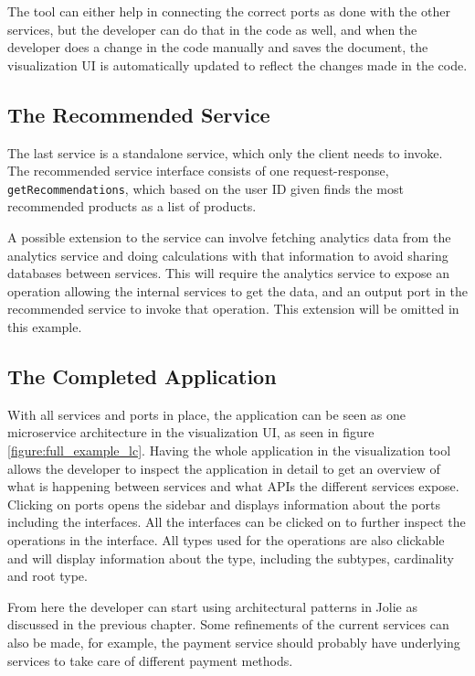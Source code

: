 The tool can either help in connecting the correct ports as done with the other services, but the developer can do that in the code as well, and when the developer does a change in the code manually and saves the document, the visualization UI is automatically updated to reflect the changes made in the code.

\subsection{The Recommended Service}
The last service is a standalone service, which only the client needs to invoke.
The recommended service interface consists of one request-response, \texttt{getRecommendations},
which based on the user ID given finds the most recommended products as a list of products.

A possible extension to the service can involve fetching analytics data from the analytics service and doing calculations with that information to avoid sharing databases between services. This will require the analytics service to expose an operation allowing the internal services to get the data, and an output port in the recommended service to invoke that operation.
This extension will be omitted in this example.

\subsection{The Completed Application}
With all services and ports in place, the application can be seen as one microservice architecture in the visualization UI, as seen in figure \ref*{figure:full_example_lc}.
Having the whole application in the visualization tool allows the developer to inspect the application in detail to get an overview of what is happening between services and what APIs the different services expose.
Clicking on ports opens the sidebar and displays information about the ports including the interfaces. All the interfaces can be clicked on to further inspect the operations in the interface. All types used for the operations are also clickable and will display information about the type,
including the subtypes, cardinality and root type.

From here the developer can start using architectural patterns in Jolie as discussed in the previous chapter. Some refinements of the current services can also be made, for example, the payment service should probably have underlying services to take care of different payment methods.

